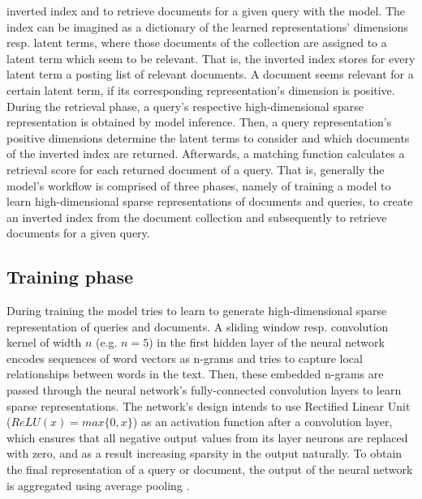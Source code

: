     inverted index and to retrieve documents for a given query 
    with the model.
The index can be imagined as a dictionary of 
    the learned representations' dimensions resp. latent terms, 
    where those documents of the collection are assigned to a 
    latent term which seem to be relevant.
That is, the inverted index stores for every latent term a posting list 
    of relevant documents.
A document seems relevant for a certain latent term, if its
    corresponding representation's dimension is positive.\\
During the retrieval phase, a query's respective high-dimensional 
    sparse representation is obtained by model inference.
Then, a query representation's positive dimensions determine
    the latent terms to consider and
    which documents of the inverted index are returned.
Afterwards, a matching function calculates a retrieval score for each
    returned document of a query. 
That is, generally the model's workflow is comprised of three phases,
    namely of training a model to learn high-dimensional sparse 
    representations of documents and queries,
    to create an inverted index from the document collection
    and subsequently to retrieve documents for a given query.
    \cite{zamani:2018:from-neural-reranking-to-neural-ranking}

\subsection*{Training phase}

During training the model tries to learn to generate high-dimensional 
    sparse representation of queries and documents.
A sliding window resp. convolution kernel of width $n$ (e.g. $n=5$)
    in the first hidden layer of the neural network encodes 
    sequences of word vectors as n-grams and tries to capture local 
    relationships between words in the text.
Then, these embedded n-grams are passed through the neural network's
    fully-connected convolution layers to learn sparse representations.
The network's design intends to use Rectified Linear Unit 
    ($ReLU(x)=max\{0,x\}$) as an activation function after a convolution
    layer, which ensures that all negative output values from its layer 
    neurons are replaced with zero, and as a result increasing
    sparsity in the output naturally.
To obtain the final representation of a query or document,
    the output of the neural network is aggregated using average pooling
    \cite{zamani:2018:from-neural-reranking-to-neural-ranking}.

